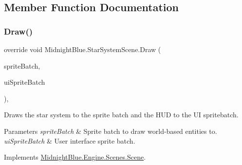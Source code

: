 \subsection{Member Function Documentation}
\hypertarget{class_midnight_blue_1_1_star_system_scene_ac3d90fb8d914d15b912f5da3cc1aa8a0}{}\label{class_midnight_blue_1_1_star_system_scene_ac3d90fb8d914d15b912f5da3cc1aa8a0} 
\subsubsection{\texorpdfstring{Draw()}{Draw()}}
{\footnotesize\ttfamily override void Midnight\+Blue.\+Star\+System\+Scene.\+Draw (\begin{DoxyParamCaption}\item[{Sprite\+Batch}]{sprite\+Batch,  }\item[{Sprite\+Batch}]{ui\+Sprite\+Batch }\end{DoxyParamCaption})\hspace{0.3cm}{\ttfamily [inline]}, {\ttfamily [virtual]}}



Draws the star system to the sprite batch and the H\+UD to the UI spritebatch. 


\begin{DoxyParams}{Parameters}
{\em sprite\+Batch} & Sprite batch to draw world-\/based entities to.\\
\hline
{\em ui\+Sprite\+Batch} & User interface sprite batch.\\
\hline
\end{DoxyParams}


Implements \hyperlink{class_midnight_blue_1_1_engine_1_1_scenes_1_1_scene_a6ec0b4be6c7dc226c9afd308e1fb3fd3}{Midnight\+Blue.\+Engine.\+Scenes.\+Scene}.

